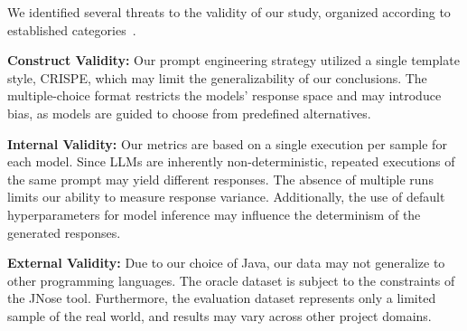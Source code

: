 \documentclass[sigconf]{acmart}
\begin{document}
We identified several threats to the validity of our study, organized according to established categories~\cite{wohlin2024experimentation}.


\textbf{Construct Validity:} Our prompt engineering strategy utilized a single template style, CRISPE, which may limit the generalizability of our conclusions. The multiple-choice format restricts the models' response space and may introduce bias, as models are guided to choose from predefined alternatives.


\textbf{Internal Validity:} Our metrics are based on a single execution per sample for each model. Since LLMs are inherently non-deterministic, repeated executions of the same prompt may yield different responses. The absence of multiple runs limits our ability to measure response variance. Additionally, the use of default hyperparameters for model inference may influence the determinism of the generated responses.




\textbf{External Validity:} Due to our choice of Java, our data may not generalize to other programming languages. The oracle dataset is subject to the constraints of the JNose tool. Furthermore, the evaluation dataset represents only a limited sample of the real world, and results may vary across other project domains.
\end{document}
